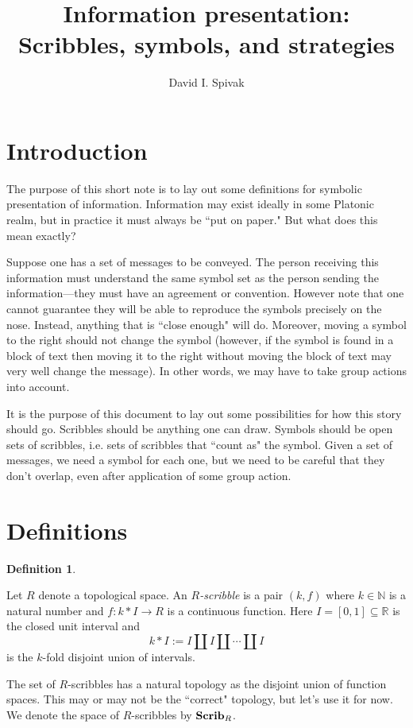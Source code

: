 \documentclass{amsart}
\def\to{\rightarrow}
\def\RR{{\mathbb R}}
\def\ss{\subseteq}
\def\taking{\colon}
\def\Scrib{{\bf Scrib}}
\def\NN{\mathbb N}
\theoremstyle{remark}
\theoremstyle{definition}
\newtheorem{definition}[theorem]{Definition}
\begin{document}
\title{Information presentation: Scribbles, symbols, and strategies}

\author{David I. Spivak}

\maketitle

\section{Introduction}

The purpose of this short note is to lay out some definitions for symbolic presentation of information. Information may exist ideally in some Platonic realm, but in practice it must always be ``put on paper." But what does this mean exactly? 

Suppose one has a set of messages to be conveyed. The person receiving this information must understand the same symbol set as the person sending the information---they must have an agreement or convention. However note that one cannot guarantee they will be able to reproduce the symbols precisely on the nose. Instead, anything that is ``close enough" will do. Moreover, moving a symbol to the right should not change the symbol (however, if the symbol is found in a block of text then moving it to the right without moving the block of text may very well change the message). In other words, we may have to take group actions into account.

It is the purpose of this document to lay out some possibilities for how this story should go. Scribbles should be anything one can draw. Symbols should be open sets of scribbles, i.e. sets of scribbles that ``count as" the symbol. Given a set of messages, we need a symbol for each one, but we need to be careful that they don't overlap, even after application of some group action.

\section{Definitions}

\begin{definition}\label{def:scribble}

Let $R$ denote a topological space. An {\em $R$-scribble} is a pair $(k,f)$ where $k\in\NN$ is a natural number and $f\taking k*I\to R$ is a continuous function. Here $I=[0,1]\ss\RR$ is the closed unit interval and $$k*I:=I\amalg I\amalg\cdots\amalg I$$ is the $k$-fold disjoint union of intervals.

The set of $R$-scribbles has a natural topology as the disjoint union of function spaces. This may or may not be the ``correct" topology, but let's use it for now. We denote the space of $R$-scribbles by $\Scrib_R$.

\end{definition}
\end{document}

